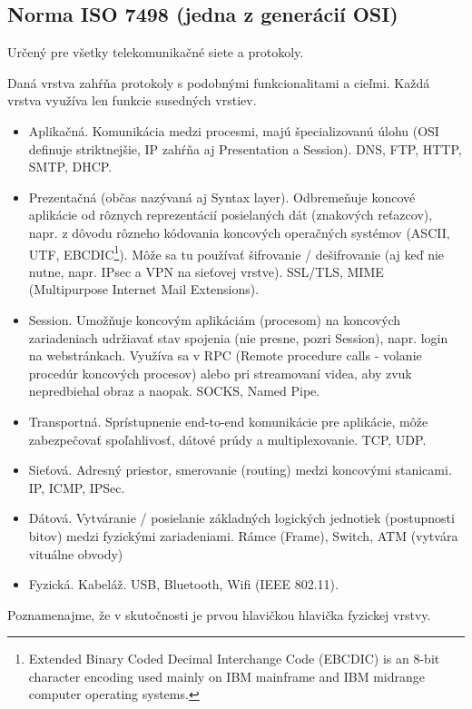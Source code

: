 \documentclass[10pt,a4paper]{article}
\begin{document}
\subsection{Norma ISO 7498 (jedna z generácií OSI)}    
\label{OSI}

Určený pre všetky telekomunikačné siete a protokoly. 

Daná vrstva zahŕňa protokoly s podobnými funkcionalitami a cieľmi. Každá vrstva využíva len funkcie susedných vrstiev. 

\begin{itemize}
\item Aplikačná. Komunikácia medzi procesmi, majú špecializovanú úlohu (OSI definuje striktnejšie, IP zahŕňa aj Presentation a Session). DNS, FTP, HTTP, SMTP, DHCP. 
\item Prezentačná (občas nazývaná aj Syntax layer). Odbremeňuje koncové aplikácie od rôznych reprezentácií posielaných dát (znakových reťazcov),
napr. z dôvodu rôzneho kódovania koncových operačných systémov (ASCII, UTF, EBCDIC\footnote{
Extended Binary Coded Decimal Interchange Code (EBCDIC) is an 8-bit character encoding used mainly on IBM mainframe and IBM midrange computer operating systems.
}). Môže sa tu používať šifrovanie / dešifrovanie (aj keď nie nutne, napr. IPsec a VPN na sieťovej vrstve). SSL/TLS, MIME (Multipurpose Internet Mail Extensions).        
\item Session. Umožňuje koncovým aplikáciám (procesom) na koncových zariadeniach udržiavať stav spojenia (nie presne, pozri Session), napr. login na webstránkach. Využíva sa v RPC (Remote procedure calls - volanie procedúr koncových procesov) alebo pri streamovaní videa, aby zvuk nepredbiehal obraz a naopak. SOCKS, Named Pipe. 
\item Transportná. Sprístupnenie end-to-end komunikácie pre aplikácie, môže zabezpečovať spoľahlivosť, dátové prúdy a multiplexovanie. TCP, UDP.                    
\item Sieťová. Adresný priestor, smerovanie (routing) medzi koncovými stanicami. IP, ICMP, IPSec. 
\item Dátová. Vytváranie / posielanie základných logických jednotiek (postupnosti bitov) medzi fyzickými zariadeniami. Rámce (Frame), Switch, ATM (vytvára vituálne obvody)
\item Fyzická. Kabeláž. USB, Bluetooth, Wifi (IEEE 802.11).
\end{itemize}

Poznamenajme, že v skutočnosti je prvou hlavičkou hlavička fyzickej vrstvy. 
                  
\end{document}
